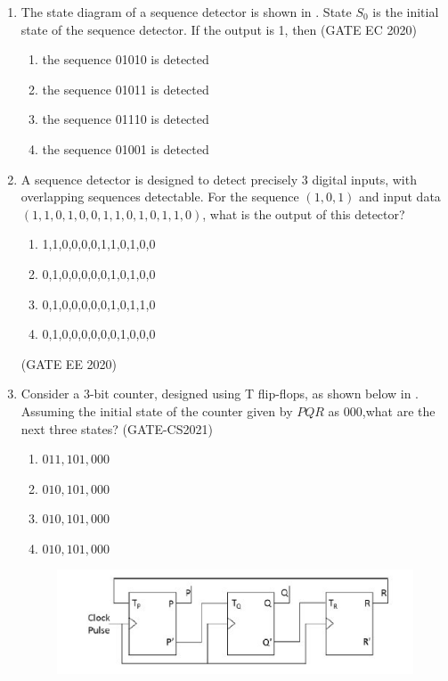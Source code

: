 \begin{enumerate}[label=\arabic*.,ref=\theenumi]
\item 	The state diagram of a sequence detector is shown in
  .
		 State $S_0$ is the initial state of the sequence detector. If the output is 1, then
\hfill (GATE EC 2020)
\begin{enumerate}
 \item the sequence 01010 is detected
 \item the sequence 01011 is detected
 \item the sequence 01110 is detected
 \item the sequence 01001 is detected	 
\end{enumerate}	
	\begin{figure}[H]
    \centering
    \resizebox{0.75\columnwidth}{!}{%
  
		}
  \caption{}
  \label{fig:gate/ec/2020/39/1}		
  \end{figure}	 
\item A sequence detector is designed to detect precisely 3 digital inputs, with overlapping sequences detectable. For the sequence $(1,0,1)$ and input data $(1,1,0,1,0,0,1,1,0,1,0,1,1,0)$, what is the output of this detector?
		\begin{enumerate}
			\item 1,1,0,0,0,0,1,1,0,1,0,0
			\item 0,1,0,0,0,0,0,1,0,1,0,0
			\item 0,1,0,0,0,0,0,1,0,1,1,0
			\item 0,1,0,0,0,0,0,0,1,0,0,0
		\end{enumerate}
		\hfill (GATE EE 2020)
\item Consider a $3$-bit counter, designed using T flip-flops, as shown below
in .
Assuming the initial state of the counter given by $PQR$ as $000$,what are the next three states?
                 \hfill(GATE-CS2021)
\begin{enumerate}
\item $011, 101, 000$
\item $010, 101, 000$
\item $010, 101, 000$
\item $010, 101, 000$
\end{enumerate}
     \begin{figure}[H]
\centering
\includegraphics[width=0.75\columnwidth]{ide/fsm/figs/3bitcounter.jpg}

\end{figure}
\end{enumerate}
